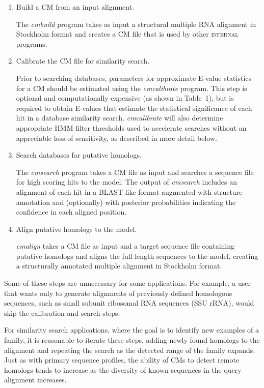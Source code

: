 \documentclass[11pt]{article}
\begin{document}
\begin{enumerate}
\item Build a CM from an input alignment.

The \emph{cmbuild} program takes as input a structural multiple
RNA alignment in Stockholm format \citep{infguide03} and creates a CM
file that is used by other \textsc{infernal} programs.

\item Calibrate the CM file for similarity search.

Prior to searching databases, parameters for approximate E-value
statistics for a CM should be estimated using the \emph{cmcalibrate}
program. This step is optional and computationally expensive (as shown
in Table~1), but is required to obtain E-values that estimate the
statistical significance of each hit in a database similarity
search. \emph{cmcalibrate} will also determine appropriate HMM filter
thresholds used to accelerate searches without an appreciable loss of
sensitivity, as described in more detail below.

\item Search databases for putative homologs.

The \emph{cmsearch} program takes a CM file as input and searches a
sequence file for high scoring hits to the model. The output of
\emph{cmsearch} includes an alignment of each hit in a BLAST-like
format augmented with structure annotation and (optionally) with
posterior probabilities indicating the confidence in each aligned
position.

\item Align putative homologs to the model.

\emph{cmalign} takes a CM file as input and a target sequence file
containing putative homologs and aligns the full length sequences to
the model, creating a structurally annotated multiple alignment in
Stockholm format.

\end{enumerate}

Some of these steps are unnecessary for some applications. For
example, a user that wants only to generate alignments of previously
defined homologous sequences, such as small subunit ribosomal RNA
sequences (SSU rRNA), would skip the calibration and search steps. 

For similarity search applications, where the goal is to identify new
examples of a family, it is reasonable to iterate these steps, adding
newly found homologs to the alignment and repeating the search as the
detected range of the family expands. Just as with primary sequence
profiles, the ability of CMs to detect remote homologs tends to
increase as the diversity of known sequences in the query alignment
increases.
\end{document}
